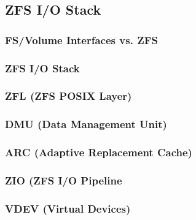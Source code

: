 \subsection{ZFS I/O Stack} %
\begin{frame}[fragile]
    \frametitle{FS/Volume Interfaces vs. ZFS}
\end{frame}
% 
% 
% 
\begin{frame}[fragile]
    \frametitle{ZFS I/O Stack}
\end{frame}
% 
% 
\begin{frame}[fragile]
    \frametitle{ZFL (ZFS POSIX Layer)}
\end{frame}
% 
% 
\begin{frame}[fragile]
    \frametitle{DMU (Data Management Unit)}
\end{frame}
% 
% 
\begin{frame}[fragile]
    \frametitle{ARC (Adaptive Replacement Cache)}
\end{frame}
% 
% 
\begin{frame}[fragile]
    \frametitle{ZIO (ZFS I/O Pipeline}
\end{frame}
% 
% 
\begin{frame}[fragile]
    \frametitle{VDEV (Virtual Devices)}
\end{frame}
% 
% 

